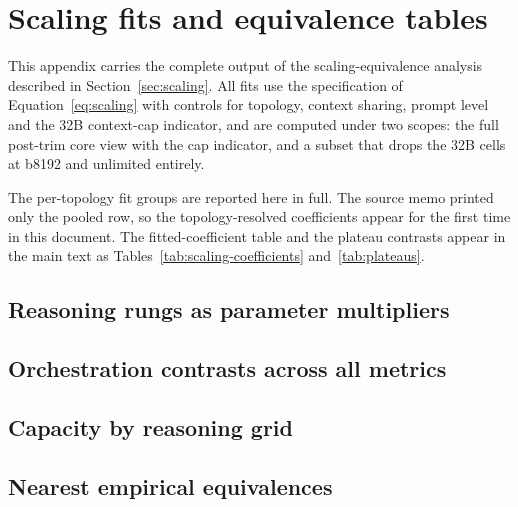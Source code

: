 \section{Scaling fits and equivalence tables}
\label{app:fits}

This appendix carries the complete output of the scaling-equivalence analysis described in
Section~\ref{sec:scaling}. All fits use the specification of Equation~\ref{eq:scaling} with
controls for topology, context sharing, prompt level and the 32B context-cap indicator, and
are computed under two scopes: the full post-trim core view with the cap indicator, and a
subset that drops the 32B cells at b8192 and unlimited entirely.

The per-topology fit groups are reported here in full. The source memo printed only the
pooled row, so the topology-resolved coefficients appear for the first time in this
document. The fitted-coefficient table and the plateau contrasts appear in the main
text as Tables~\ref{tab:scaling-coefficients} and~\ref{tab:plateaus}.

\subsection{Reasoning rungs as parameter multipliers}


\clearpage
\subsection{Orchestration contrasts across all metrics}


\clearpage
\subsection{Capacity by reasoning grid}


\clearpage
\subsection{Nearest empirical equivalences}

